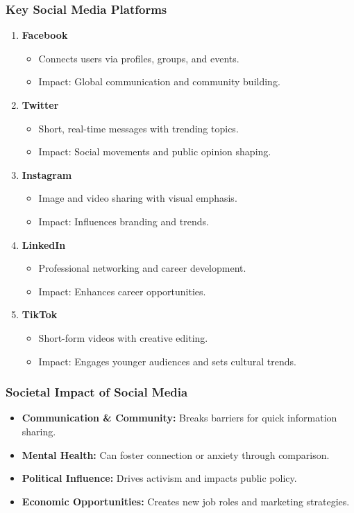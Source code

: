 \documentclass{beamer}
\begin{document}
\begin{frame}[fragile]
    \frametitle{Key Social Media Platforms}
    \begin{enumerate}
        \item \textbf{Facebook}
            \begin{itemize}
                \item Connects users via profiles, groups, and events.
                \item Impact: Global communication and community building.
            \end{itemize}
        \item \textbf{Twitter}
            \begin{itemize}
                \item Short, real-time messages with trending topics.
                \item Impact: Social movements and public opinion shaping.
            \end{itemize}
        \item \textbf{Instagram}
            \begin{itemize}
                \item Image and video sharing with visual emphasis.
                \item Impact: Influences branding and trends.
            \end{itemize}
        \item \textbf{LinkedIn}
            \begin{itemize}
                \item Professional networking and career development.
                \item Impact: Enhances career opportunities.
            \end{itemize}
        \item \textbf{TikTok}
            \begin{itemize}
                \item Short-form videos with creative editing.
                \item Impact: Engages younger audiences and sets cultural trends.
            \end{itemize}
    \end{enumerate}
\end{frame}

\begin{frame}[fragile]
    \frametitle{Societal Impact of Social Media}
    \begin{itemize}
        \item \textbf{Communication \& Community:} Breaks barriers for quick information sharing.
        \item \textbf{Mental Health:} Can foster connection or anxiety through comparison.
        \item \textbf{Political Influence:} Drives activism and impacts public policy.
        \item \textbf{Economic Opportunities:} Creates new job roles and marketing strategies.
    \end{itemize}
\end{frame}
\end{document}
